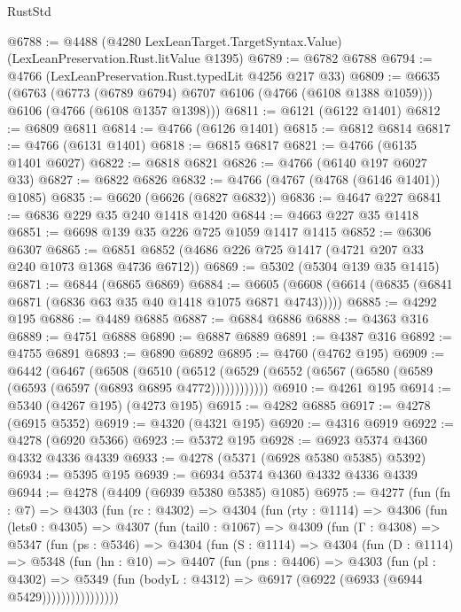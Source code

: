 \begin{lexlean}{RustStd}
\begin{coremodule}
{\begin{coremodule}
{{{{{{{{{{{{{{{{{{{{{{{{{{{{{{{{{{{@6788 := @4488 (@4280 LexLeanTarget.TargetSyntax.Value) (LexLeanPreservation.Rust.litValue @1395)
@6789 := @6782 @6788
@6794 := @4766 (LexLeanPreservation.Rust.typedLit @4256 @217 @33)
@6809 := @6635
    (@6763
      (@6773 (@6789 @6794) @6707 @6106 (@4766 (@6108 @1388 @1059)))
      @6106
      (@4766 (@6108 @1357 @1398)))
@6811 := @6121 (@6122 @1401)
@6812 := @6809 @6811
@6814 := @4766 (@6126 @1401)
@6815 := @6812 @6814
@6817 := @4766 (@6131 @1401)
@6818 := @6815 @6817
@6821 := @4766 (@6135 @1401 @6027)
@6822 := @6818 @6821
@6826 := @4766 (@6140 @197 @6027 @33)
@6827 := @6822 @6826
@6832 := @4766 (@4767 (@4768 (@6146 @1401)) @1085)
@6835 := @6620 (@6626 (@6827 @6832))
@6836 := @4647 @227
@6841 := @6836 @229 @35 @240 @1418 @1420
@6844 := @4663 @227 @35 @1418
@6851 := @6698 @139 @35 @226 @725 @1059 @1417 @1415
@6852 := @6306 @6307
@6865 := @6851 @6852 (@4686 @226 @725 @1417 (@4721 @207 @33 @240 @1073 @1368 @4736 @6712))
@6869 := @5302 (@5304 @139 @35 @1415)
@6871 := @6844 (@6865 @6869)
@6884 := @6605 (@6608 (@6614 (@6835 (@6841 @6871 (@6836 @63 @35 @40 @1418 @1075 @6871 @4743)))))
@6885 := @4292 @195
@6886 := @4489 @6885
@6887 := @6884 @6886
@6888 := @4363 @316
@6889 := @4751 @6888
@6890 := @6887 @6889
@6891 := @4387 @316
@6892 := @4755 @6891
@6893 := @6890 @6892
@6895 := @4760 (@4762 @195)
@6909 := @6442
    (@6467
      (@6508
        (@6510
          (@6512 (@6529 (@6552 (@6567 (@6580 (@6589 (@6593 (@6597 (@6893 @6895 @4772))))))))))))
@6910 := @4261 @195
@6914 := @5340 (@4267 @195) (@4273 @195)
@6915 := @4282 @6885
@6917 := @4278 (@6915 @5352)
@6919 := @4320 (@4321 @195)
@6920 := @4316 @6919
@6922 := @4278 (@6920 @5366)
@6923 := @5372 @195
@6928 := @6923 @5374 @4360 @4332 @4336 @4339
@6933 := @4278 (@5371 (@6928 @5380 @5385) @5392)
@6934 := @5395 @195
@6939 := @6934 @5374 @4360 @4332 @4336 @4339
@6944 := @4278 (@4409 (@6939 @5380 @5385) @1085)
@6975 := @4277
    (fun (fn : @7) =>
    @4303
      (fun (rc : @4302) =>
      @4304
        (fun (rty : @1114) =>
        @4306
          (fun (lets0 : @4305) =>
          @4307
            (fun (tail0 : @1067) =>
            @4309
              (fun (Γ : @4308) =>
              @5347
                (fun (ps : @5346) =>
                @4304
                  (fun (S : @1114) =>
                  @4304
                    (fun (D : @1114) =>
                    @5348
                      (fun (hn : @10) =>
                      @4407
                        (fun (pns : @4406) =>
                        @4303
                          (fun (pl : @4302) =>
                          @5349
                            (fun (bodyL : @4312) => @6917 (@6922 (@6933 (@6944 @5429))))))))))))))))
}}}}}}}}}}}}}}}}}}}}}}}}}}}}}}}}}}}
\end{coremodule}}
\end{coremodule}
\end{lexlean}
